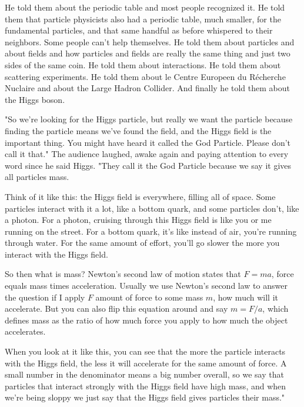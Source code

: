 He told them about the periodic table and most people recognized it. He told them that particle physicists also had a periodic table, much smaller, for the fundamental particles, and that same handful as before whispered to their neighbors. Some people can't help themselves. He told them about particles and about fields and how particles and fields are really the same thing and just two sides of the same coin. He told them about interactions. He told them about scattering experiments. He told them about le Centre Europeen du Récherche Nuclaire and about the Large Hadron Collider. And finally he told them about the Higgs boson.

\mypause

"So we're looking for the Higgs particle, but really we want the particle because finding the particle means we've found the field, and the Higgs field is the important thing. You might have heard it called the God Particle. Please don't call it that." The audience laughed, awake again and paying attention to every word since he said Higgs. "They call it the God Particle because we say it gives all particles mass.

Think of it like this: the Higgs field is everywhere, filling all of space. Some particles interact with it a lot, like a bottom quark, and some particles don't, like a photon. For a photon, cruising through this Higgs field is like you or me running on the street. For a bottom quark, it's like instead of air, you're running through water. For the same amount of effort, you'll go slower the more you interact with the Higgs field.

So then what is mass? Newton's second law of motion states that $F=ma$, force equals mass times acceleration. Usually we use Newton's second law to answer the question if I apply $F$ amount of force to some mass $m$, how much will it accelerate. But you can also flip this equation around and say $m=F/a$, which defines mass as the ratio of how much force you apply to how much the object accelerates.

When you look at it like this, you can see that the more the particle interacts with the Higgs field, the less it will accelerate for the same amount of force. A small number in the denominator means a big number overall, so we say that particles that interact strongly with the Higgs field have high mass, and when we're being sloppy we just say that the Higgs field gives particles their mass." 


